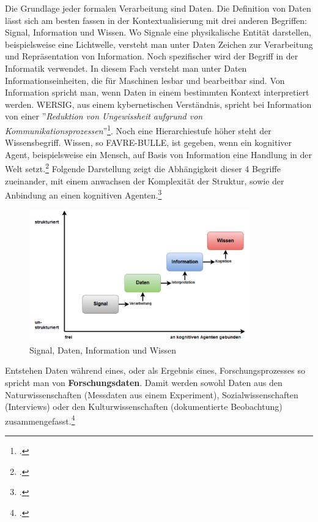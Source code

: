 \documentclass[12pt,a4paper]{article}
\begin{document}
Die Grundlage jeder formalen Verarbeitung sind Daten. Die Definition von Daten lässt sich am besten fassen in der Kontextualisierung mit drei anderen Begriffen: Signal, Information und Wissen. Wo Signale eine physikalische Entität darstellen, beispielsweise eine Lichtwelle, versteht man unter Daten Zeichen zur Verarbeitung und Repräsentation von Information. Noch spezifischer wird der Begriff in der Informatik verwendet. In diesem Fach versteht man unter Daten Informationseinheiten, die für Maschinen lesbar und bearbeitbar sind. Von Information spricht man, wenn Daten in einem bestimmten Kontext interpretiert werden. WERSIG, aus einem kybernetischen Verständnis, spricht bei Information von einer ''\textit{Reduktion von Ungewissheit aufgrund von Kommunikationsprozessen}''\footcite[][S.74]{wersig1971information}. Noch eine Hierarchiestufe höher steht der Wissensbegriff. Wissen, so FAVRE-BULLE, ist gegeben, wenn ein kognitiver Agent, beispielsweise ein Mensch, auf Basis von Information eine Handlung in der Welt setzt.\footcite[][S.93-97]{favre2001information} Folgende Darstellung zeigt die Abhängigkeit dieser 4 Begriffe zueinander, mit einem anwachsen der Komplexität der Struktur, sowie der Anbindung an einen kognitiven Agenten.\footcite[Eine ausführlichere Auseinandersetzung mit den Begriffen Daten, Information und Wissen findet sich in meiner ersten Abschlussarbeit.][Masterarbeit Graz, S.20-28]{pollin2017suchen}
\begin{figure}[H]
\centering
	\includegraphics[width=0.85\textwidth]{img/daten.png}  
    \caption[Signal, Daten, Information und Wissen. POLLIN Christopher: Vom Suchen, Stöbern und Finden : Information Retrieval am Beispiel der Digitalen Sammlung des Hans Gross Kriminalmuseums, Masterarbeit Graz, S.21 ]{Signal, Daten, Information und Wissen} \label{fig:daten}
\end{figure} 
Entstehen Daten während eines, oder als Ergebnis eines, Forschungsprozesses so spricht man von \textbf{Forschungsdaten}. Damit werden sowohl Daten aus den Naturwissenschaften (Messdaten aus einem Experiment), Sozialwissenschaften (Interviews) oder den Kulturwissenschaften (dokumentierte Beobachtung) zusammengefasst.\footcite[][09.06.2019]{kindling2013forschungsdatenmanagement}
\end{document}
